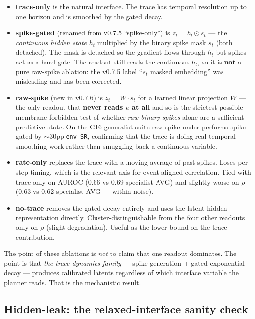 \documentclass{article}
\begin{document}
\begin{itemize}
\item \textbf{trace-only} is the natural interface. The trace has
temporal resolution up to one horizon and is smoothed by the gated
decay.
\item \textbf{spike-gated} (renamed from v0.7.5 ``spike-only'') is
$z_t = h_t \odot s_t$ --- the \emph{continuous hidden state} $h_t$
multiplied by the binary spike mask $s_t$ (both detached). The mask
is detached so the gradient flows through $h_t$ but spikes act as a
hard gate. The readout still reads the continuous $h_t$, so it is
\textbf{not} a pure raw-spike ablation: the v0.7.5 label ``$s_t$
masked embedding'' was misleading and has been corrected.
\item \textbf{raw-spike} (new in v0.7.6) is $z_t = W \cdot s_t$ for a
learned linear projection $W$ --- the only readout that \textbf{never
reads $h$ at all} and so is the strictest possible membrane-forbidden
test of whether \emph{raw binary spikes} alone are a sufficient
predictive state. On the G16 generalist suite raw-spike under-performs
spike-gated by $\sim$30pp \texttt{env-SR}, confirming that the trace is doing
real temporal-smoothing work rather than smuggling back a continuous
variable.
\item \textbf{rate-only} replaces the trace with a moving average of
past spikes. Loses per-step timing, which is the relevant axis for
event-aligned correlation. Tied with trace-only on AUROC (0.66 vs 0.69
specialist AVG) and slightly worse on $\rho$ (0.63 vs 0.62 specialist
AVG --- within noise).
\item \textbf{no-trace} removes the gated decay entirely and uses the
latent hidden representation directly. Cluster-distinguishable from
the four other readouts only on $\rho$ (slight degradation). Useful as
the lower bound on the trace contribution.
\end{itemize}

The point of these ablations is \emph{not} to claim that one readout
dominates. The point is that \emph{the trace dynamics family} ---
spike generation + gated exponential decay --- produces calibrated
latents regardless of which interface variable the planner reads.
That is the mechanistic result.

\subsection{Hidden-leak: the relaxed-interface sanity check}
\end{document}

